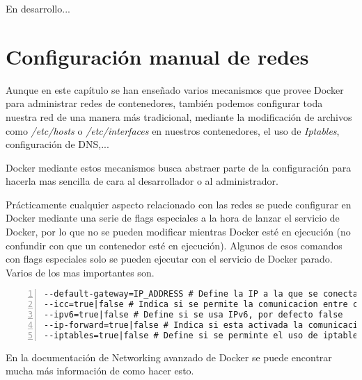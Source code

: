 	En desarrollo...

\fi
	
	\section{Configuración manual de redes}
	Aunque en este capítulo se han enseñado varios mecanismos que provee Docker para administrar redes de contenedores, también podemos configurar toda nuestra red de una manera más tradicional, mediante la modificación de archivos como \emph{/etc/hosts} o \emph{/etc/interfaces} en nuestros contenedores, el uso de \emph{Iptables}, configuración de DNS,... 
	
	Docker mediante estos mecanismos busca abstraer parte de la configuración para hacerla mas sencilla de cara al desarrollador o al administrador.
	
	Prácticamente cualquier aspecto relacionado con las redes se puede configurar en Docker mediante una serie de flags especiales a la hora de lanzar el servicio de Docker, por lo que no se pueden modificar mientras Docker esté en ejecución (no confundir con que un contenedor esté en ejecución). Algunos de esos comandos con flags especiales solo se pueden ejecutar con el servicio de Docker parado. Varios de los mas importantes son.
	
	\begin{lstlisting}[style=consola,numbers=left]
--default-gateway=IP_ADDRESS # Define la IP a la que se conectaran los contenedores de Docker al crearse, por defecto se usa la de docker0
--icc=true|false # Indica si se permite la comunicacion entre contenedores, por defecto true
--ipv6=true|false # Define si se usa IPv6, por defecto false
--ip-forward=true|false # Indica si esta activada la comunicacion entre los contenedores y el exterior, por defecto true
--iptables=true|false # Define si se perminte el uso de iptables (filtra direcciones y puertos, se usa como firewall en sistemas tipo UNIX)
	\end{lstlisting}
	
	En la documentación de Networking avanzado de Docker \cite{docker-network-advanced} se puede encontrar mucha más información de como hacer esto.
	